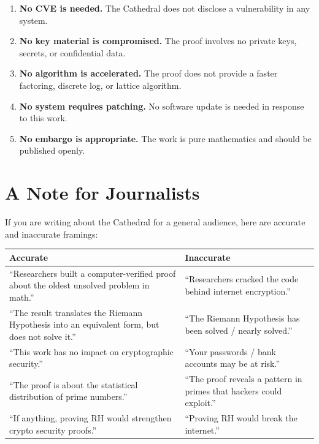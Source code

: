 \documentclass[11pt,a4paper]{article}
\theoremstyle{definition}
\theoremstyle{plain}
\begin{document}
\begin{enumerate}
  \item \textbf{No CVE is needed.} The Cathedral does not disclose
    a vulnerability in any system.
  \item \textbf{No key material is compromised.} The proof involves
    no private keys, secrets, or confidential data.
  \item \textbf{No algorithm is accelerated.} The proof does not
    provide a faster factoring, discrete log, or lattice algorithm.
  \item \textbf{No system requires patching.} No software update
    is needed in response to this work.
  \item \textbf{No embargo is appropriate.} The work is pure
    mathematics and should be published openly.
\end{enumerate}

\section{A Note for Journalists}
\label{sec:journalists}

If you are writing about the Cathedral for a general audience,
here are accurate and inaccurate framings:

\begin{center}
\begin{tabular}{@{}p{}p{}@{}}
\toprule
\textbf{\color{green!50!black}Accurate} &
\textbf{\color{red!70!black}Inaccurate} \\
\midrule
``Researchers built a computer-verified proof about the oldest
unsolved problem in math.'' &
``Researchers cracked the code behind internet encryption.'' \\[0.5em]
``The result translates the Riemann Hypothesis into an equivalent
form, but does not solve it.'' &
``The Riemann Hypothesis has been solved / nearly solved.'' \\[0.5em]
``This work has no impact on cryptographic security.'' &
``Your passwords / bank accounts may be at risk.'' \\[0.5em]
``The proof is about the statistical distribution of prime numbers.'' &
``The proof reveals a pattern in primes that hackers could exploit.'' \\[0.5em]
``If anything, proving RH would strengthen crypto security proofs.'' &
``Proving RH would break the internet.'' \\
\bottomrule
\end{tabular}
\end{center}
\end{document}
